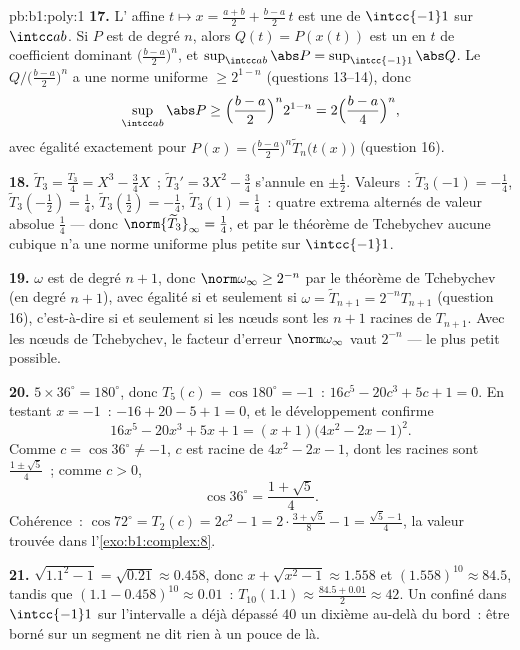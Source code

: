 \begin{solution}{pb:b1:poly:1}
\textbf{17.} L' affine $t \mapsto x = \frac{a+b}2 +
\frac{b-a}2\,t$ est une  de $\intcc{-1}1$ sur $\intcc ab$.
Si $P$ est  de degré $n$, alors $Q(t) = P(x(t))$ est un
 en $t$ de coefficient dominant
$\bigl(\frac{b-a}2\bigr)^n$, et $\sup_{\intcc ab}\abs P =
\sup_{\intcc{-1}1}\abs Q$. Le 
$Q/\bigl(\frac{b-a}2\bigr)^n$ a une norme uniforme $\geq 2^{1-n}$
(questions 13--14), donc
\[
\sup_{\intcc ab}\abs P \geq \Bigl(\frac{b-a}2\Bigr)^n 2^{1-n}
= 2\Bigl(\frac{b-a}4\Bigr)^n ,
\]
avec égalité exactement pour $P(x) = \bigl(\frac{b-a}2\bigr)^n
\widetilde T_n\bigl(t(x)\bigr)$ (question 16).

\textbf{18.} $\widetilde T_3 = \frac{T_3}4 = X^3 - \frac34X$~;
$\widetilde T_3{}' = 3X^2 - \frac34$ s'annule en $\pm\frac12$.
Valeurs~: $\widetilde T_3(-1) = -\frac14$, $\widetilde
T_3(-\tfrac12) = \frac14$, $\widetilde T_3(\tfrac12) = -\frac14$,
$\widetilde T_3(1) = \frac14$~: quatre extrema alternés de valeur
absolue $\frac14$ --- donc $\norm{\widetilde T_3}_\infty =
\frac14$, et par le théorème de Tchebychev aucune cubique 
n'a une norme uniforme plus petite sur $\intcc{-1}1$.

\textbf{19.} $\omega$ est  de degré $n + 1$, donc
$\norm\omega_\infty \geq 2^{-n}$ par le théorème de Tchebychev (en
degré $n+1$), avec égalité si et seulement si $\omega = \widetilde
T_{n+1} = 2^{-n}T_{n+1}$ (question 16), c'est-à-dire si et seulement
si les nœuds sont les $n + 1$ racines de $T_{n+1}$. Avec les nœuds
de Tchebychev, le facteur d'erreur $\norm\omega_\infty$ vaut $2^{-n}$
--- le plus petit possible.

\textbf{20.} $5 \times 36^\circ = 180^\circ$, donc $T_5(c) =
\cos180^\circ = -1$~: $16c^5 - 20c^3 + 5c + 1 = 0$. En testant $x =
-1$~: $-16 + 20 - 5 + 1 = 0$, et le développement confirme
\[
16x^5 - 20x^3 + 5x + 1 = (x + 1)\bigl(4x^2 - 2x - 1\bigr)^2 .
\]
Comme $c = \cos36^\circ \neq -1$, $c$ est racine de $4x^2 - 2x -
1$, dont les racines sont $\frac{1 \pm \sqrt5}4$~; comme $c > 0$,
\[
\cos36^\circ = \frac{1 + \sqrt5}4 .
\]
Cohérence~: $\cos72^\circ = T_2(c) = 2c^2 - 1 = 2\cdot\frac{3 +
\sqrt5}8 - 1 = \frac{\sqrt5 - 1}4$, la valeur trouvée dans
l'\cref{exo:b1:complex:8}.

\textbf{21.} $\sqrt{1.1^2 - 1} = \sqrt{0.21} \approx 0.458$, donc
$x + \sqrt{x^2-1} \approx 1.558$ et $(1.558)^{10} \approx 84.5$,
tandis que $(1.1 - 0.458)^{10} \approx 0.01$~: $T_{10}(1.1) \approx
\frac{84.5 + 0.01}2 \approx 42$. Un  confiné dans
$\intcc{-1}1$ sur l'intervalle a déjà dépassé $40$ un dixième
au-delà du bord~: être borné sur un segment ne dit rien à un pouce
de là.


\end{solution}

